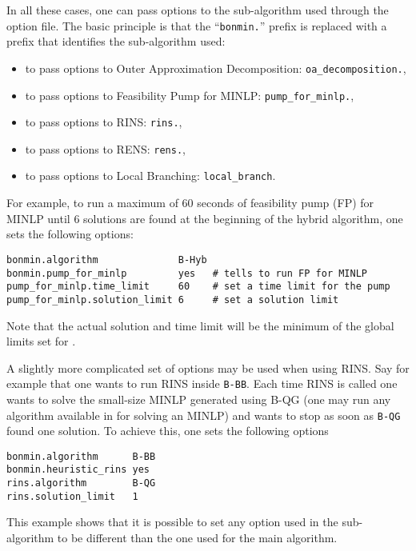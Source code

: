 In all these cases, one can pass options to the sub-algorithm used through the option file.
The basic principle is that the ``\texttt{bonmin.}'' prefix  is replaced with a prefix that identifies the sub-algorithm used:
\begin{itemize}
\vspace{-2ex}
\setlength{\parskip}{.2ex}
\setlength{\itemsep}{0pt}
\setlength{\partopsep}{0pt}
\item to pass options to Outer Approximation Decomposition: {\tt oa\_decomposition.},
\item to pass options to Feasibility Pump for MINLP: {\tt pump\_for\_minlp.},
\item to pass options to RINS: {\tt rins.},
\item to pass options to RENS: {\tt rens.},
\item to pass options to Local Branching: {\tt local\_branch}.
\end{itemize}

\vspace{-2ex}
For example, to run a maximum of 60 seconds of feasibility pump (FP) for MINLP until 6 solutions are found at the beginning of the hybrid algorithm, one sets the following options:
\begin{verbatim}
bonmin.algorithm              B-Hyb
bonmin.pump_for_minlp         yes   # tells to run FP for MINLP
pump_for_minlp.time_limit     60    # set a time limit for the pump
pump_for_minlp.solution_limit 6     # set a solution limit
\end{verbatim}
Note that the actual solution and time limit will be the minimum of the global limits set for \BONMIN.

A slightly more complicated set of options may be used when using RINS.
Say for example that one wants to run RINS inside \texttt{B-BB}.
Each time RINS is called one wants to solve the small-size MINLP generated using B-QG (one may run any algorithm available in \BONMIN for solving an MINLP) and wants to stop as soon as \texttt{B-QG} found one solution.
To achieve this, one sets the following options
\begin{verbatim}
bonmin.algorithm      B-BB
bonmin.heuristic_rins yes
rins.algorithm        B-QG
rins.solution_limit   1
\end{verbatim}
This example shows that it is possible to set any option used in the sub-algorithm to be different than the one used for the main algorithm.

